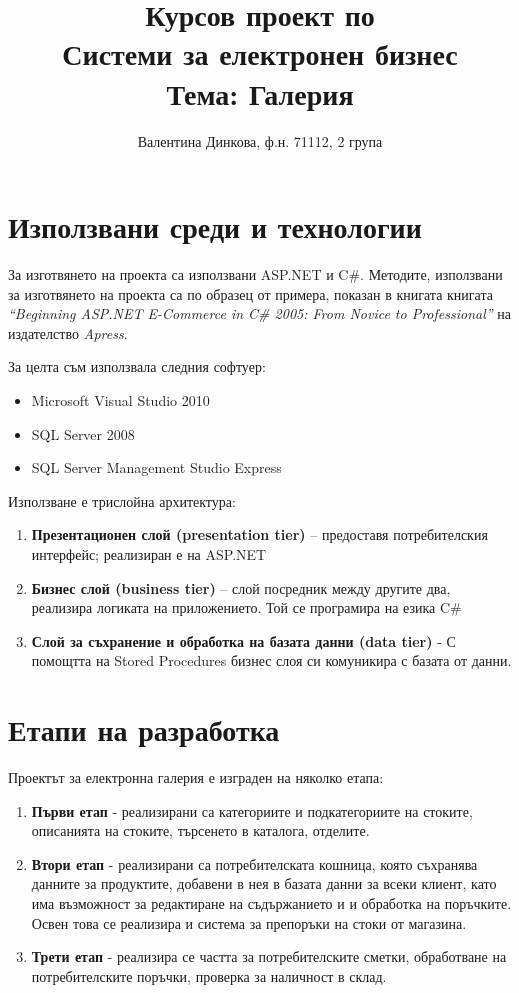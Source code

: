 \documentclass[a4paper,14pt]{article}
\title{
\hline
\vspace{0.5cm}
Курсов проект по
\\ \vspace{0.5cm} Системи за електронен бизнес
\vspace{0.5cm}
\hline
\\ \vspace{2cm}\Large{Тема: Галерия}}
\author{Валентина Динкова, ф.н. 71112, 2 група}
\begin{document}
\maketitle

\newpage

\section{Използвани среди и технологии}
За изготвянето на проекта са използвани ASP.NET и C\#. Методите, използвани за изготвянето на проекта са по образец от примера,
 показан в книгата книгата \textit{“Beginning ASP.NET E-Commerce in C\# 2005: From Novice to Professional”} на издателство \textit{Apress}.
 
 За целта съм използвала следния софтуер:
 \begin{itemize}
\item
Microsoft Visual Studio 2010
\item
SQL Server 2008
\item
SQL Server Management Studio Express
\end{itemize}

Използване е трислойна архитектура:
\begin{enumerate}
\item
\textbf{Презентационен слой (presentation tier)} – предоставя потребителския интерфейс; реализиран е на ASP.NET
\item
\textbf{Бизнес слой (business tier)} – слой посредник между другите два, реализира логиката на приложението. Той се програмира на езика C\#
\item
\textbf{Слой за съхранение и обработка на базата данни (data tier)} -  С помощтта на Stored Procedures бизнес слоя си комуникира с базата от данни.
\end{enumerate}

\section{Етапи на разработка}
Проектът за електронна галерия е изграден на няколко етапа:
\begin{enumerate}
\item
\textbf{Първи етап} - реализирани са категориите и подкатегориите на стоките, описанията на стоките, търсенето в каталога, отделите.
\item
\textbf{Втори етап} - реализирани са потребителската кошница, която съхранява данните за продуктите, добавени в нея в базата данни за всеки клиент, като има възможност за редактиране на съдържанието и и обработка на поръчките. Освен това се реализира и система за препоръки на стоки от магазина.

\item
\textbf{Трети етап} - реализира се частта за потребителските сметки, обработване на потребителските поръчки, проверка за наличност в склад.


\end{enumerate}
\end{document}
